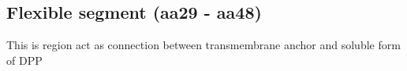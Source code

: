 \subsection{Flexible segment (aa29 - aa48)}

This is region act as connection between transmembrane anchor and soluble form of DPP
